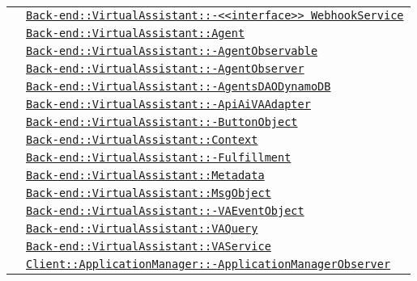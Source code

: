 \begin{longtable}{|>{\centering}m{3cm}|m{10cm}<{\centering}|}
& \hyperref[Back-end::VirtualAssistant::<<interface>> WebhookService]{\texttt{Back-end::VirtualAssistant::-\linebreak <<interface>> WebhookService}}\\
& \hyperref[Back-end::VirtualAssistant::Agent]{\texttt{Back-end::VirtualAssistant::Agent}}\\
& \hyperref[Back-end::VirtualAssistant::AgentObservable]{\texttt{Back-end::VirtualAssistant::-\linebreak AgentObservable}}\\
& \hyperref[Back-end::VirtualAssistant::AgentObserver]{\texttt{Back-end::VirtualAssistant::-\linebreak AgentObserver}}\\
& \hyperref[Back-end::VirtualAssistant::AgentsDAODynamoDB]{\texttt{Back-end::VirtualAssistant::-\linebreak AgentsDAODynamoDB}}\\
& \hyperref[Back-end::VirtualAssistant::ApiAiVAAdapter]{\texttt{Back-end::VirtualAssistant::-\linebreak ApiAiVAAdapter}}\\
& \hyperref[Back-end::VirtualAssistant::ButtonObject]{\texttt{Back-end::VirtualAssistant::-\linebreak ButtonObject}}\\
& \hyperref[Back-end::VirtualAssistant::Context]{\texttt{Back-end::VirtualAssistant::Context}}\\
& \hyperref[Back-end::VirtualAssistant::Fulfillment]{\texttt{Back-end::VirtualAssistant::-\linebreak Fulfillment}}\\
& \hyperref[Back-end::VirtualAssistant::Metadata]{\texttt{Back-end::VirtualAssistant::Metadata}}\\
& \hyperref[Back-end::VirtualAssistant::MsgObject]{\texttt{Back-end::VirtualAssistant::MsgObject}}\\
& \hyperref[Back-end::VirtualAssistant::VAEventObject]{\texttt{Back-end::VirtualAssistant::-\linebreak VAEventObject}}\\
& \hyperref[Back-end::VirtualAssistant::VAQuery]{\texttt{Back-end::VirtualAssistant::VAQuery}}\\
& \hyperref[Back-end::VirtualAssistant::VAService]{\texttt{Back-end::VirtualAssistant::VAService}}\\
& \hyperref[Client::ApplicationManager::ApplicationManagerObserver]{\texttt{Client::ApplicationManager::-\linebreak ApplicationManagerObserver}}\\

\end{longtable}
